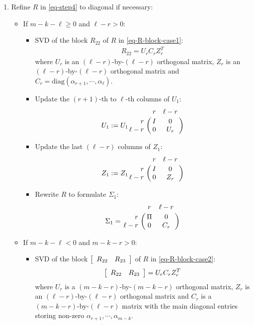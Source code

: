 \begin{enumerate}[Step 2(1).]
 
\item \label{alg:csd6} 
Refine $R$ in \eqref{eq-step4} to diagonal if necessary:  

\begin{itemize} 
\item If $m - k - \ell \geq 0$ and $\ell - r > 0$:

\begin{itemize}
\item SVD of the block $R_{22}$ of $R$ in \eqref{eq-R-block-case1}: 
\begin{align} \label{eq-r-svd-case1}
R_{22} = U_{r}C_{r}Z_{r}^{T}
\end{align}
where $U_{r}$ is an $(\ell-r)$-by-$(\ell-r)$ orthogonal matrix, 
$Z_{r}$ is an $(\ell-r)$-by-$(\ell-r)$ orthogonal matrix and 
$C_{r} = \mbox{diag}(\alpha_{r+1}, \cdots, \alpha_{\ell})$.

\item Update the $(r+1)$-th to $\ell$-th columns of $U_{1}$:
    \begin{displaymath}
    U_{1} := U_{1}\bordermatrix{ & r & \ell-r \cr
    \hfill r & I & 0 \cr
    \hfill \ell-r & 0 & U_{r}}
    \end{displaymath}
    
\item Update the last $(\ell-r)$ columns of $Z_{1}$:
    \begin{displaymath}
    Z_{1} := Z_{1}\bordermatrix{ & r & \ell-r \cr
    \hfill r & I & 0 \cr
    \hfill \ell-r & 0 & Z_{r}}
    \end{displaymath}
    
\item Rewrite $R$ to formulate $\Sigma_{1}$:
    \begin{displaymath}
    \Sigma_{1} = \bordermatrix{ & r & \ell-r \cr
    \hfill r & \Pi & 0 \cr
    \hfill \ell-r & 0 & C_{r}}
    \end{displaymath}
\end{itemize}

\item If $m - k - \ell < 0$ and $m - k - r > 0$:

\begin{itemize} 
\item SVD of the block $\left[ \begin{array}{cc} R_{22} & R_{23} \end{array} \right]$ of $R$ 
in \eqref{eq-R-block-case2}: 
\begin{align} \label{eq-r-svd-case2}
\left[ \begin{array}{cc} R_{22} & R_{23} \end{array} \right] = U_{r}C_{r}Z_{r}^{T}
\end{align} 
where $U_{r}$ is a $(m-k-r)$-by-$(m-k-r)$ orthogonal matrix, 
$Z_{r}$ is an $(\ell-r)$-by-$(\ell-r)$ orthogonal matrix and $C_{r}$ 
is a $(m-k-r)$-by-$(\ell-r)$ matrix with the main diagonal entries 
storing non-zero $\alpha_{r+1}, \cdots, \alpha_{m-k}$.


\end{itemize}
\end{itemize}
\end{enumerate}
